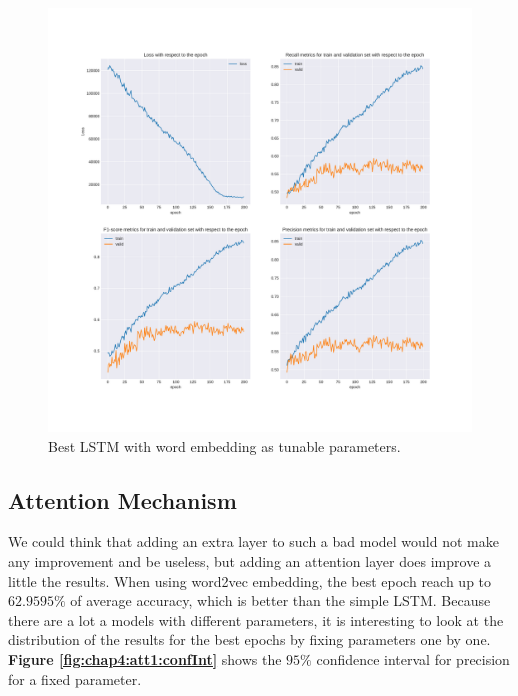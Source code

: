 \begin{figure}
	\centering
	\includegraphics[width=\textwidth]{images/chapitre4/lstm1}
	\caption{Best LSTM with word embedding as tunable parameters.}
	\label{fig:chap4:lstm1}
\end{figure}


\subsection{Attention Mechanism}
We could think that adding an extra layer to such a bad model would not make any improvement and be useless, but adding an attention layer does improve a little the results. When using word2vec embedding, the best epoch reach up to $62.9595\%$ of average accuracy, which is better than the simple LSTM. Because there are a lot a models with different parameters, it is interesting to look at the distribution of the results for the best epochs by fixing parameters one by one. \textbf{Figure \ref{fig:chap4:att1:confInt}} shows the $95\%$ confidence interval for precision for a fixed parameter. \\

